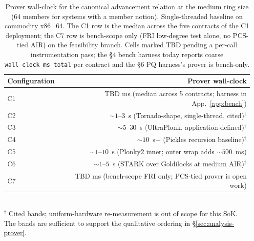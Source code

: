 \begin{table}[t]
  \centering
  \caption{Prover wall-clock for the canonical advancement relation
    at the medium ring size (64 members for systems with a member
    notion). Single-threaded baseline on commodity x86\_64. The C1
    row is the median across the five contracts of the C1 deployment;
    the C7 row is bench-scope only (FRI low-degree test alone, no
    PCS-tied AIR) on the feasibility branch. Cells marked TBD pending
    a per-call instrumentation pass; the §4 bench harness today
    reports coarse \texttt{wall\_clock\_ms\_total} per contract and
    the §6 PQ harness's prover is bench-only.}
  \label{tab:prover-time}
  \begin{tabular}{lr}
    \toprule
    Configuration & Prover wall-clock \\
    \midrule
    C1  & TBD ms (median across 5 contracts; harness in App.\ \ref{app:bench}) \\
    C2  & ${\sim}1$--$3$~s (Tornado-shape, single-thread, cited)$^\dagger$ \\
    C3  & ${\sim}5$--$30$~s (UltraPlonk, application-defined)$^\dagger$ \\
    C4  & ${\sim}10$~s+ (Pickles recursion baseline)$^\dagger$ \\
    C5  & ${\sim}1$--$10$~s (Plonky2 inner; outer wrap adds ${\sim}500$~ms) \\
    C6  & ${\sim}1$--$5$~s (STARK over Goldilocks at medium AIR)$^\dagger$ \\
    C7  & TBD ms (bench-scope FRI only; PCS-tied prover is open work) \\
    \bottomrule
  \end{tabular}
  \\[0.5em]
  \footnotesize
  $^\dagger$ Cited bands; uniform-hardware re-measurement is out of
  scope for this SoK. The bands are sufficient to support the
  qualitative ordering in \S\ref{sec:analysis-prover}.
\end{table}
